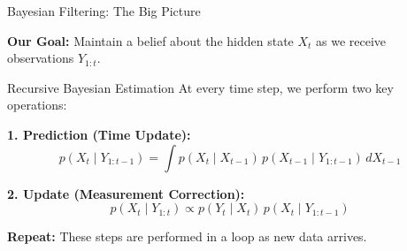 \documentclass[handout,aspectratio=169]{beamer}
\begin{document}
\begin{frame}{Bayesian Filtering: The Big Picture}

\textbf{Our Goal:} Maintain a belief about the hidden state \( X_t \) as we receive observations \( Y_{1:t} \).

\vspace{1em}
\begin{block}{Recursive Bayesian Estimation}
At every time step, we perform two key operations:
\end{block}

\vspace{0.5em}
\textbf{1. Prediction (Time Update):}
\[
p(X_{t} \mid Y_{1:t-1}) = \int p(X_t \mid X_{t-1}) \, p(X_{t-1} \mid Y_{1:t-1}) \, dX_{t-1}
\]

\vspace{0.5em}
\textbf{2. Update (Measurement Correction):}
\[
p(X_t \mid Y_{1:t}) \propto p(Y_t \mid X_t) \, p(X_t \mid Y_{1:t-1})
\]

\vspace{0.5em}
\textbf{Repeat:} These steps are performed in a loop as new data arrives.
\end{frame}
\end{document}
